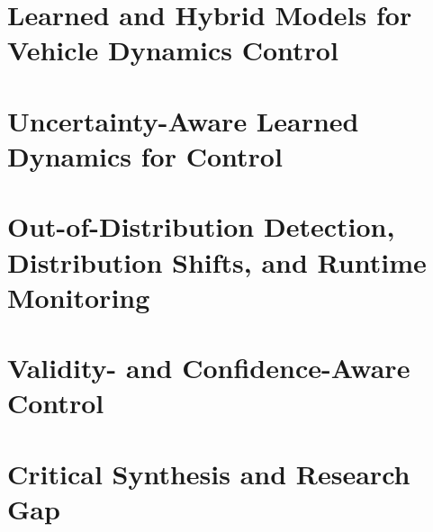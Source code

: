 \documentclass[12pt,a4paper]{report}
\begin{document}
\section{Learned and Hybrid Models for Vehicle Dynamics Control}

%

\section{Uncertainty-Aware Learned Dynamics for Control}

%

\section{Out-of-Distribution Detection, Distribution Shifts, and Runtime Monitoring}

%

\section{Validity- and Confidence-Aware Control}

%

\section{Critical Synthesis and Research Gap}
\end{document}

